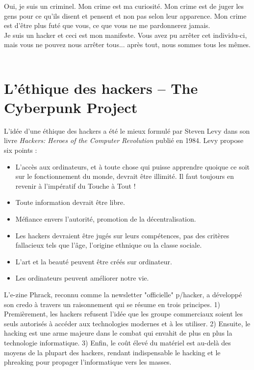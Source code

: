 \documentclass[11pt,twoside,a4paper]{book}
\begin{document}
Oui, je suis un criminel. Mon crime est ma curiosit{\'e}. Mon crime est de juger les gens pour ce qu'ils disent et pensent et non pas selon leur apparence. Mon crime est d'{\^e}tre plus fut{\'e} que vous, ce que vous ne me pardonnerez jamais. ~\\

Je suis un hacker et ceci est mon manifeste. Vous avez pu arr{\^e}ter cet individu-ci, mais vous ne pouvez nous arr{\^e}ter tous... apr{\`e}s tout, nous sommes tous les m{\^e}mes. ~\\

\clearpage

\section{L'{\'e}thique des hackers -- The Cyberpunk Project}


L'id{\'e}e d'une {\'e}thique des hackers a {\'e}t{\'e} le mieux formul{\'e} par Steven Levy dans son livre \emph{Hackers: Heroes of the Computer Revolution} publi{\'e} en 1984. Levy propose six points : 
\begin{itemize}
	\setlength{\itemsep}{1pt}
	\setlength{\parskip}{0pt}
	\setlength{\parsep}{0pt}
	
	\item L'acc{\`e}s aux ordinateurs, et {\`a} toute chose qui puisse apprendre quoique ce soit sur le fonctionnement du monde, devrait {\^e}tre illimit{\'e}. Il faut toujours en revenir {\`a} l'imp{\'e}ratif du Touche {\`a} Tout !
	\item Toute information devrait {\^e}tre libre.
	\item M{\'e}fiance envers l'autorit{\'e}, promotion de la d{\'e}centralisation.
	\item Les hackers devraient {\^e}tre jug{\'e}s sur leurs comp{\'e}tences, pas des crit{\`e}res fallacieux tels que l'{\^a}ge, l'origine ethnique ou la classe sociale.
	\item L'art et la beaut{\'e} peuvent {\^e}tre cr{\'e}{\'e}s sur ordinateur.
	\item Les ordinateurs peuvent am{\'e}liorer notre vie.
\end{itemize} %

L'e-zine Phrack, reconnu comme la newsletter "officielle" p/hacker, a d{\'e}velopp{\'e} son credo {\`a} travers un raisonnement qui se r{\'e}sume en trois principes. 1) Premi{\`e}rement, les hackers refusent l'id{\'e}e que les groupe commerciaux soient les seuls autoris{\'e}s {\`a} acc{\'e}der aux technologies modernes et {\`a} les utiliser. 2) Ensuite, le hacking est une arme majeure dans le combat qui envahit de plus en plus la technologie informatique. 3) Enfin, le co{\^u}t {\'e}lev{\'e} du mat{\'e}riel est au-del{\`a} des moyens de la plupart des hackers, rendant indispensable le hacking et le phreaking pour propager l'informatique vers les masses. %
\end{document}
